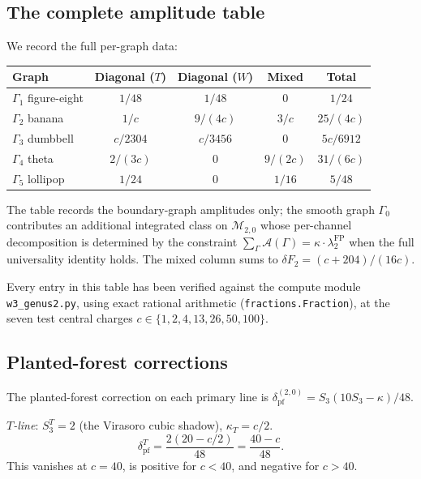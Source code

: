 \subsection{The complete amplitude table}
\label{subsec:amplitude-table}

We record the full per-graph data:

\begin{center}
\small
\renewcommand{\arraystretch}{1.3}
\begin{tabular}{lcccc}
\textbf{Graph}
& \textbf{Diagonal ($T$)}
& \textbf{Diagonal ($W$)}
& \textbf{Mixed}
& \textbf{Total} \\
\hline
$\Gamma_1$ figure-eight
& $1/48$ & $1/48$ & $0$ & $1/24$ \\[2pt]
$\Gamma_2$ banana
& $1/c$ & $9/(4c)$ & $3/c$ & $25/(4c)$ \\[2pt]
$\Gamma_3$ dumbbell
& $c/2304$ & $c/3456$ & $0$ & $5c/6912$ \\[2pt]
$\Gamma_4$ theta
& $2/(3c)$ & $0$ & $9/(2c)$ & $31/(6c)$ \\[2pt]
$\Gamma_5$ lollipop
& $1/24$ & $0$ & $1/16$ & $5/48$ \\
\end{tabular}
\end{center}

The table records the boundary-graph amplitudes only; the
smooth graph $\Gamma_0$ contributes an additional integrated
class on $\mathcal{M}_{2,0}$ whose per-channel decomposition
is determined by the constraint
$\sum_\Gamma \mathcal{A}(\Gamma) = \kappa \cdot \lambda_2^{\mathrm{FP}}$
when the full universality identity holds.
The mixed column sums to
$\delta F_2 = (c+204)/(16c)$.

Every entry in this table has been verified against the compute
module \texttt{w3\_genus2.py}, using exact rational arithmetic
(\texttt{fractions.Fraction}), at the seven test central charges
$c \in \{1, 2, 4, 13, 26, 50, 100\}$.


\subsection{Planted-forest corrections}
\label{subsec:planted-forest}

The planted-forest correction on each primary line is
$\delta_{\mathrm{pf}}^{(2,0)} = S_3(10 S_3 - \kappa)/48$.

\emph{$T$-line}: $S_3^T = 2$ (the Virasoro cubic shadow),
$\kappa_T = c/2$.
\begin{equation}\label{eq:pf-T}
\delta_{\mathrm{pf}}^T
= \frac{2(20 - c/2)}{48}
= \frac{40 - c}{48}.
\end{equation}
This vanishes at $c = 40$, is positive for $c < 40$, and negative
for $c > 40$.

